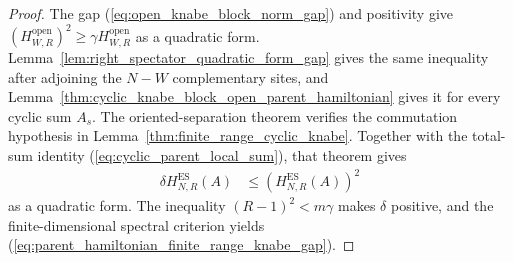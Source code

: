 \begin{proof}
    \leanok
    The gap (\ref{eq:open_knabe_block_norm_gap}) and positivity give
    $(H^{\mathrm{open}}_{W,R})^2\geq\gamma H^{\mathrm{open}}_{W,R}$ as a
    quadratic form.  Lemma~\ref{lem:right_spectator_quadratic_form_gap} gives
    the same inequality after adjoining the $N-W$ complementary sites, and
    Lemma~\ref{thm:cyclic_knabe_block_open_parent_hamiltonian} gives it for
    every cyclic sum $A_s$.  The oriented-separation theorem verifies the
    commutation hypothesis in
    Lemma~\ref{thm:finite_range_cyclic_knabe}.  Together with the total-sum
    identity (\ref{eq:cyclic_parent_local_sum}), that theorem gives
    \begin{align}
        \delta H_{N,R}^{\mathrm{ES}}(A)
         & \leq\left(H_{N,R}^{\mathrm{ES}}(A)\right)^2
    \end{align}
    as a quadratic form.  The inequality
    $(R-1)^2<m\gamma$ makes $\delta$ positive, and the finite-dimensional
    spectral criterion yields
    (\ref{eq:parent_hamiltonian_finite_range_knabe_gap}).
\end{proof}

